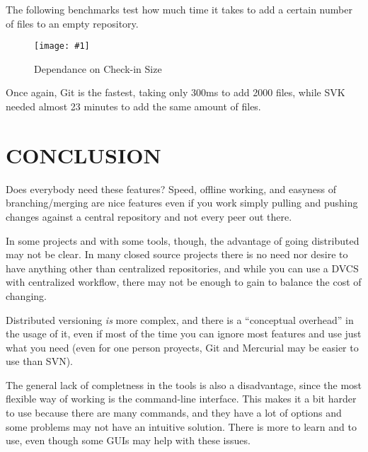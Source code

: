 \documentclass[a4paper,10pt]{article}
\newcommand{\diagrama}[2]{
    \begin{figure}[h]
        \begin{center}
            \texttt{[image: \#1]} 
        \end{center}
        \caption{#2}
    \end{figure}
}
\begin{document}
The following benchmarks test how much time it takes to add a certain number of files to an empty repository.

\diagrama{dvcs_roundup_plot_steps1.jpg}{Dependance on Check-in Size}

Once again, Git is the fastest, taking only 300ms to add 2000 files, while SVK needed almost 23 minutes to add the same amount of files.

\section{CONCLUSION}

Does everybody need these features? Speed, offline working, 
and easyness of branching/merging are nice features even if you work simply pulling 
and pushing changes against a central repository and not every peer out there. 

In some projects and with some tools, though, the advantage of going distributed may not be clear. 
In many closed source projects there is no need nor desire to have anything
other than centralized repositories, and while you can use a DVCS with centralized
workflow, there may not be enough to gain to balance the cost of changing.

Distributed versioning \emph{is} more complex, and there is a ``conceptual overhead'' in the usage 
of it, even if most of the time you can ignore most features and use just what you need 
(even for one person proyects, Git and Mercurial may be easier to use than SVN).

The general lack of completness in the tools is also a disadvantage, since the most flexible
way of working is the command-line interface. This makes it a bit harder to use because there 
are many commands, and they have a lot of options and some problems may not have an intuitive 
solution. There is more to learn and to use, even though some GUIs may help with these issues.
\end{document}
